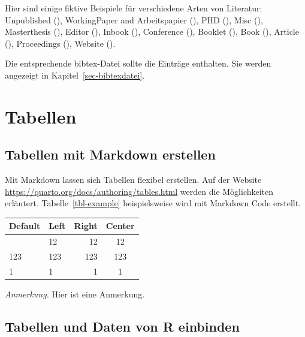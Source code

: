 \documentclass[
  stu,
  floatsintext,
  longtable,
  a4paper,
  nolmodern,
  notxfonts,
  notimes,
  donotrepeattitle,
  colorlinks=true,linkcolor=blue,citecolor=blue,urlcolor=blue]{apa7}
\begin{document}
Hier sind einige fiktive Beispiele für verschiedene Arten von Literatur:
Unpublished (), WorkingPaper and
Arbeitspapier (), PHD
(), Misc (),
Masterthesis (), Editor
(), Inbook
(), Conference
(), Booklet
(), Book (),
Article (), Proceedings
(), Website
().

Die entsprechende bibtex-Datei sollte die Einträge enthalten. Sie werden
angezeigt in Kapitel~\ref{sec-bibtexdatei}.

\section{Tabellen}\label{tabellen}

\subsection{Tabellen mit Markdown
erstellen}\label{tabellen-mit-markdown-erstellen}

Mit Markdown lassen sich Tabellen flexibel erstellen. Auf der Website
\url{https://quarto.org/docs/authoring/tables.html} werden die
Möglichkeiten erläutert. Tabelle~\ref{tbl-example} beispielsweise wird
mit Markdown Code erstellt.

\begin{table}

{\caption{{Eine beispielhafte Tabelle erstellt mit
Markdown}{\label{tbl-example}}}}

\begin{longtable}[]{@{}llrc@{}}
\toprule\noalign{}
Default & Left & Right & Center \\
\midrule\noalign{}
\endhead
\bottomrule\noalign{}
\endlastfoot
12 & 12 & 12 & 12 \\
123 & 123 & 123 & 123 \\
1 & 1 & 1 & 1 \\
\end{longtable}

{\noindent \emph{Anmerkung.} Hier ist eine Anmerkung.}

\end{table}

\subsection{Tabellen und Daten von R
einbinden}\label{tabellen-und-daten-von-r-einbinden}
\end{document}
